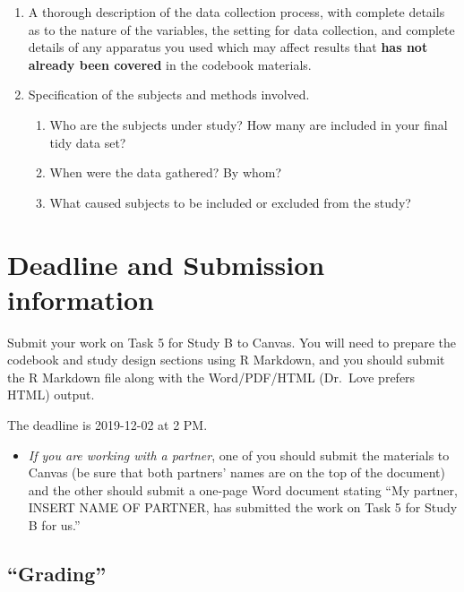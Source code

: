 \documentclass[]{book}
\providecommand{\tightlist}{%
  \setlength{\itemsep}{0pt}\setlength{\parskip}{0pt}}
\begin{document}
\begin{enumerate}
\def\labelenumi{\arabic{enumi}.}
\setcounter{enumi}{1}
\item
  A thorough description of the data collection process, with complete details as to the nature of the variables, the setting for data collection, and complete details of any apparatus you used which may affect results that \textbf{has not already been covered} in the codebook materials.
\item
  Specification of the subjects and methods involved.

  \begin{enumerate}
  \def\labelenumii{\alph{enumii}.}
  \tightlist
  \item
    Who are the subjects under study? How many are included in your final tidy data set?
  \item
    When were the data gathered? By whom?
  \item
    What caused subjects to be included or excluded from the study?
  \end{enumerate}
\end{enumerate}

\hypertarget{deadline-and-submission-information-8}{%
\section{Deadline and Submission information}\label{deadline-and-submission-information-8}}

Submit your work on Task 5 for Study B to Canvas. You will need to prepare the codebook and study design sections using R Markdown, and you should submit the R Markdown file along with the Word/PDF/HTML (Dr.~Love prefers HTML) output.

The deadline is 2019-12-02 at 2 PM.

\begin{itemize}
\tightlist
\item
  \emph{If you are working with a partner}, one of you should submit the materials to Canvas (be sure that both partners' names are on the top of the document) and the other should submit a one-page Word document stating ``My partner, INSERT NAME OF PARTNER, has submitted the work on Task 5 for Study B for us.''
\end{itemize}

\hypertarget{grading-8}{%
\subsection{``Grading''}\label{grading-8}}
\end{document}

